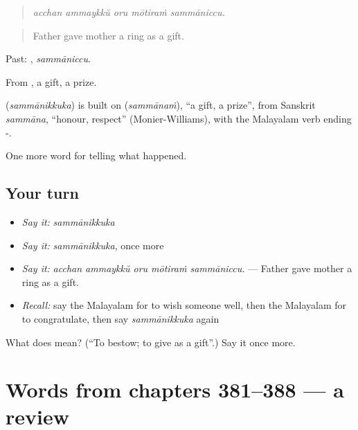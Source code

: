 \begin{quote}
\emph{acchan ammaykkŭ oru mōtiraṁ sammāniccu.}
\end{quote}

\begin{quote}
Father gave mother a ring as a gift.
\end{quote}

Past: , \emph{sammāniccu}.

From , a gift, a prize.

\begin{cousinweb}
\textbf{} (\emph{sammānikkuka}) is built on  (\emph{sammānaṁ}), \textquotedblleft{}a gift, a prize\textquotedblright{}, from Sanskrit \emph{sammāna}, \textquotedblleft{}honour, respect\textquotedblright{} (Monier-Williams), with the Malayalam verb ending -.
\end{cousinweb}

\begin{grammarlens}[title={What you've built}]
One more word for telling what happened.
\end{grammarlens}

\subsection*{Your turn}
\begin{itemize}
\raggedright
  \item \emph{Say it:} \emph{sammānikkuka}
  \item \emph{Say it:} \emph{sammānikkuka}, once more
  \item \emph{Say it:} \emph{acchan ammaykkŭ oru mōtiraṁ sammāniccu.} — Father gave mother a ring as a gift.
  \item \emph{Recall:} say the Malayalam for to wish someone well, then the Malayalam for to congratulate, then say \emph{sammānikkuka} again
\end{itemize}

\begin{tcolorbox}[breakable,colback=teal!4,colframe=teal!35!black,title={Before you move on}]
What does  mean? (\textquotedblleft{}To bestow; to give as a gift\textquotedblright{}.) Say it once more.
\end{tcolorbox}
\section[(dialogue)]{Words from chapters 381–388 — a review}

